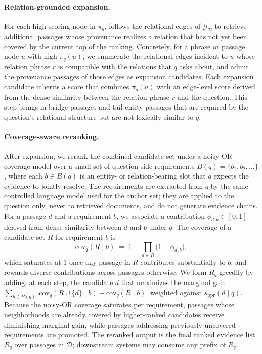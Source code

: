 \paragraph{Relation-grounded expansion.}
For each high-scoring node in $\pi_q$, \methodname{} follows the relational
edges of $\mathcal{G}_{\mathcal{D}}$ to retrieve additional passages whose
provenance realizes a relation that has not yet been covered by the
current top of the ranking. Concretely, for a phrase or passage node $u$
with high $\pi_q(u)$, we enumerate the relational edges incident to $u$
whose relation phrase $r$ is compatible with the relations that $q$ asks
about, and admit the provenance passages of those edges as expansion
candidates. Each expansion candidate inherits a score that combines
$\pi_q(u)$ with an edge-level score derived from the dense similarity
between the relation phrase $r$ and the question. This step brings in
bridge passages and tail-entity passages that are required by the
question's relational structure but are not lexically similar to $q$.

\paragraph{Coverage-aware reranking.}
After expansion, we rerank the combined candidate set under a noisy-OR
coverage model over a small set of question-side requirements
$B(q) = \{b_1, b_2, \ldots\}$, where each $b \in B(q)$ is an entity- or
relation-bearing slot that $q$ expects the evidence to jointly resolve.
The requirements are extracted from $q$ by the same controlled language
model used for the anchor set; they are applied to the question only,
never to retrieved documents, and do not generate evidence chains. For a
passage $d$ and a requirement $b$, we associate a contribution
$\phi_{d,b} \in [0,1]$ derived from dense similarity between $d$ and $b$
under $q$. The coverage of a candidate set $R$ for requirement $b$ is
\begin{equation}
\label{eq:noisy-or}
\mathrm{cov}_q(R \mid b)
\;=\;
1 - \prod_{d \in R}\bigl(1 - \phi_{d,b}\bigr),
\end{equation}
which saturates at $1$ once any passage in $R$ contributes substantially
to $b$, and rewards diverse contributions across passages otherwise. We
form $R_q$ greedily by adding, at each step, the candidate $d$ that
maximizes the marginal gain
$\sum_{b \in B(q)}\bigl[\mathrm{cov}_q(R \cup \{d\} \mid b) - \mathrm{cov}_q(R \mid b)\bigr]$
weighted against $s_{\mathrm{ppr}}(d \mid q)$. Because the noisy-OR
coverage saturates per requirement, passages whose neighborhoods are
already covered by higher-ranked candidates receive diminishing marginal
gain, while passages addressing previously-uncovered requirements are
promoted. The reranked output is the final ranked evidence list $R_q$
over passages in $\mathcal{D}$; downstream systems may consume any prefix
of $R_q$.
